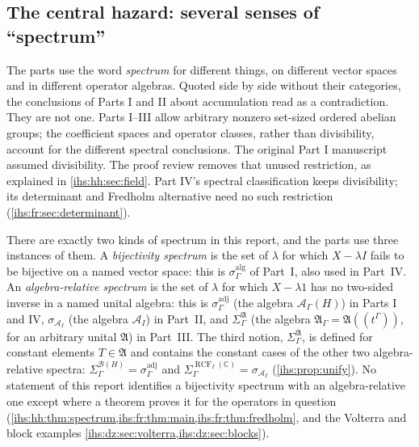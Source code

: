 \documentclass[11pt,a4paper]{article}
\numberwithin{equation}{section}
\theoremstyle{definition}
\theoremstyle{remark}
\newcommand{\C}{\mathbb C}
\newcommand{\B}{\mathcal B(H)}
\newcommand{\Ahh}{\mathcal A_\Gamma(H)}
\newcommand{\Arf}{\mathcal A_I}
\newcommand{\RCF}{\operatorname{RCF}}
\newcommand{\Alg}{\mathfrak A}
\newcommand{\AlgG}{\mathfrak A_\Gamma}
\newcommand{\SigA}{\Sigma^{\Alg}_\Gamma}
\begin{document}
\subsection{The central hazard: several senses of ``spectrum''}\label{ihs:sec:hazard}
The parts use the word \emph{spectrum} for different things, on different
vector spaces and in different operator algebras. Quoted side by side without
their categories, the conclusions of Parts I and II about accumulation read
as a contradiction. They are not one. Parts I--III allow arbitrary nonzero
set-sized ordered abelian groups; the coefficient spaces and operator classes,
rather than divisibility, account for the different spectral conclusions.
The original Part I manuscript assumed divisibility. The proof review removes
that unused restriction, as explained in \cref{ihs:hh:sec:field}. Part IV's
spectral classification keeps divisibility; its determinant and Fredholm
alternative need no such restriction (\cref{ihs:fr:sec:determinant}).

There are exactly two kinds of spectrum in this report, and the parts use
three instances of them. A \emph{bijectivity spectrum} is the set of $\lambda$
for which $X-\lambda I$ fails to be bijective on a named vector space: this
is $\sigma^{\mathrm{alg}}_\Gamma$ of Part~I, also used in Part~IV. An
\emph{algebra-relative spectrum} is the set of $\lambda$ for which
$X-\lambda1$ has no two-sided inverse in a named unital algebra: this is
$\sigma^{\mathrm{adj}}_\Gamma$ (the algebra $\Ahh$) in Parts I and IV,
$\sigma_{\Arf}$ (the algebra $\Arf$) in Part~II, and $\SigA$ (the algebra
$\AlgG=\Alg((t^\Gamma))$, for an arbitrary unital $\Alg$) in Part~III. The
third notion, $\SigA$, is defined for constant elements $T\in\Alg$ and
contains the constant cases of the other two algebra-relative spectra:
$\Sigma^{\B}_\Gamma=\sigma^{\mathrm{adj}}_\Gamma$ and
$\Sigma^{\RCF_I(\C)}_\Gamma=\sigma_{\Arf}$ (\cref{ihs:prop:unify}). No
statement of this report identifies a bijectivity spectrum with an
algebra-relative one except where a theorem proves it for the operators in
question (\cref{ihs:hh:thm:spectrum,ihs:fr:thm:main,ihs:fr:thm:fredholm},
and the Volterra and block examples
\cref{ihs:dz:sec:volterra,ihs:dz:sec:blocks}).
\end{document}

